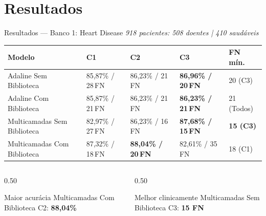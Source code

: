 \documentclass[aspectratio=169,11pt,brazil]{beamer}
\begin{document}
\section{Resultados}

\begin{frame}{Resultados — Banco 1: Heart Disease}
  \centering\small
  \textit{918 pacientes: 508 doentes | 410 saudáveis}
  \vspace{0.3em}

  \renewcommand{\arraystretch}{1.35}
  \begin{tabular}{lllll}
    \toprule
    \textbf{Modelo} & \textbf{C1} & \textbf{C2} & \textbf{C3} & \textbf{FN mín.} \\
    \midrule
    Adaline Sem Biblioteca & 85,87\% / 28\,FN & 86,23\% / 21\,FN & \textbf{86,96\% / 20\,FN} & 20 (C3) \\
    Adaline Com Biblioteca & 85,87\% / 21\,FN & 86,23\% / 21\,FN & \textbf{86,23\% / 21\,FN} & 21 (Todos) \\
    Multicamadas Sem Biblioteca     & 82,97\% / 27\,FN & 86,23\% / 16\,FN & \cellcolor{ufvjmbluelight}\textbf{87,68\% / 15\,FN} & \textbf{15 (C3)} \\
    Multicamadas Com Biblioteca     & 87,32\% / 18\,FN & \cellcolor{ufvjmbluelight}\textbf{88,04\% / 20\,FN} & 82,61\% / 35\,FN & 18 (C1) \\
    \bottomrule
  \end{tabular}

  \vfill
  \begin{columns}[T]
    \begin{column}{0.50\textwidth}
      \begin{block}{Maior acurácia}
        Multicamadas Com Biblioteca C2: \textbf{88,04\%}
      \end{block}
    \end{column}
    \begin{column}{0.50\textwidth}
      \begin{alertblock}{Melhor clinicamente}
        Multicamadas Sem Biblioteca C3: \textbf{15 FN}
      \end{alertblock}
    \end{column}
  \end{columns}
  \vspace{0.2em}
\end{frame}
\end{document}
